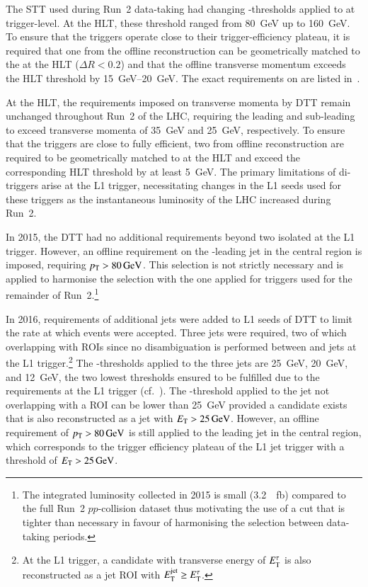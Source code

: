 The STT used during Run~2 data-taking had changing \pT-thresholds
applied to \tauhadvis at trigger-level. At the HLT, these threshold
ranged from \SI{80}{\GeV} up to \SI{160}{\GeV}. To ensure that the
triggers operate close to their trigger-efficiency plateau, it is
required that one \tauhadvis from the offline reconstruction can be
geometrically matched to the \tauhadvis at the HLT ($\Delta R < 0.2$)
and that the offline \tauhadvis transverse momentum exceeds the HLT
threshold by \SIrange{15}{20}{\GeV}. The exact requirements on
\tauhadvis are listed in~.

At the HLT, the requirements imposed on \tauhadvis transverse momenta
by DTT remain unchanged throughout Run~2 of the LHC, requiring the
leading and sub-leading \tauhadvis to exceed transverse momenta of
\SI{35}{\GeV} and \SI{25}{\GeV}, respectively. To ensure that the
triggers are close to fully efficient, two \tauhadvis from offline
reconstruction are required to be geometrically matched to \tauhadvis
at the HLT and exceed the corresponding HLT threshold by at least
\SI{5}{\GeV}. The primary limitations of di-\tauhadvis triggers arise
at the L1 trigger, necessitating changes in the L1 seeds used for
these triggers as the instantaneous luminosity of the LHC increased
during Run~2.

In 2015, the DTT had no additional requirements beyond two isolated
\tauhadvis at the L1 trigger. However, an offline requirement on the
\pT-leading jet in the central region is imposed, requiring
$\pT > \SI{80}{\GeV}$. This selection is not strictly necessary and is
applied to harmonise the selection with the one applied for triggers
used for the remainder of Run~2.\footnote{The integrated luminosity
  collected in 2015 is small (\SI{3.2}{\per\femto\barn}) compared to
  the full Run~2 $pp$-collision dataset thus motivating the use of a
  cut that is tighter than necessary in favour of harmonising the
  selection between data-taking periods.}

In 2016, requirements of additional jets were added to L1 seeds of DTT
to limit the rate at which events were accepted. Three jets were
required, two of which overlapping with \tauhadvis ROIs since no
disambiguation is performed between \tauhadvis and jets at the L1
trigger.\footnote{At the L1 trigger, a \tauhadvis candidate with
  transverse energy of $E_{\text{T}}^\tau$ is also reconstructed as a jet ROI
  with $E_{\text{T}}^{\text{jet}} \geq E_{\text{T}}^\tau$.}  The \ET-thresholds applied
to the three jets are \SI{25}{\GeV}, \SI{20}{\GeV}, and \SI{12}{\GeV},
the two lowest thresholds ensured to be fulfilled due to the
\tauhadvis requirements at the L1 trigger (cf.\
). The \ET-threshold applied to the jet not
overlapping with a \tauhadvis ROI can be lower than \SI{25}{\GeV}
provided a \tauhadvis candidate exists that is also reconstructed as a
jet with $E_{\text{T}} > \SI{25}{\ensuremath{\text{GeV}}}$. However, an offline requirement of
$\pT > \SI{80}{\GeV}$ is still applied to the leading jet in the
central region, which corresponds to the trigger efficiency plateau of
the L1 jet trigger with a threshold of $E_{\text{T}} > \SI{25}{\ensuremath{\text{GeV}}}$.

